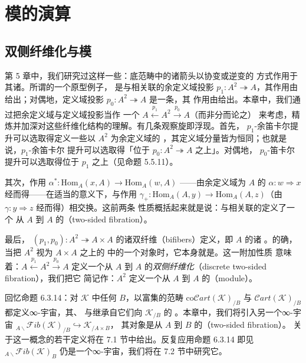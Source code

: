 \part{模的演算}
\chapter{双侧纤维化与模}\label{ch:two-sided-fibrations-modules}


第 5 章中，我们研究过这样一些\trIsofibration：底范畴中的诸箭头以协变或逆变的
方式作用于其诸\trFiber。所谓\emph{\trCocartesianFibration}的一个原型例子，
是与\trArrowInfinityCategory{}相关联的余定义域投影\trFunctor{}
$p_{1}\colon A^{2}\twoheadrightarrow A$，其\trFiberwise{}作用由%
\trPostComposition{}给出；对偶地，定义域投影\trFunctor{}
$p_{0}\colon A^{2}\twoheadrightarrow A$ 是一条\trCartesianFibration，其%
\trFiberwise{}作用由\trPreComposition{}给出。本章中，我们通过把余定义域与定义域投影\trFunctor{}当作
一个\trSpan{} $A\xleftarrow{p_{1}}A^{2}\xrightarrow{p_{0}}A$（而非分而论之）
来考虑，精炼并加深对这些纤维化结构的理解。有几条观察旋即浮现。首先，%
$p_{1}$-余笛卡尔提升可以选取得定义一些以 $A^{2}$ 为余定义域的%
\trNaturalTransformation，其定义域分量皆为恒同；也就是说，$p_{1}$-余笛卡尔
提升可以选取得「位于 $p_{0}\colon A^{2}\twoheadrightarrow A$ 之上」。对偶地，
$p_{0}$-笛卡尔提升可以选取得位于 $p_{1}$ 之上（见命题 5.5.11）。

其次，\trFiberwise{}作用 $\alpha^{*}\colon\mathrm{Hom}_{A}(x,A)\to\mathrm{Hom}_{A}(w,A)$
——由余定义域为 $A$ 的\trNaturalTransformation{} $\alpha\colon w\Rightarrow x$
经\trPreComposition{}而得——在适当的意义下，与作用
$\gamma_{+}\colon\mathrm{Hom}_{A}(A,y)\to\mathrm{Hom}_{A}(A,z)$（由
$\gamma\colon y\Rightarrow z$ 经\trPostComposition{}而得）相交换。这前两条
性质概括起来就是说：与\trArrowInfinityCategory{}相关联的\trSpan{}定义了一个
从 $A$ 到 $A$ 的\emph{\trTwoSidedFibration}（two-sided fibration）。

最后，\trIsofibration{} $(p_{1},p_{0})\colon A^{2}\twoheadrightarrow A\times A$
的诸双纤维（bifibers）定义\trDiscrete{}\trInfinityCategory，即 $A$ 的诸%
\trMappingSpace。的确，当把 $A^{2}$ 视为 $A\times A$ 之上的%
\trSliceInfinityCosmos{}中的一个对象时，它本身就是\trDiscrete。这一附加性质
意味着：$A\xleftarrow{p_{1}}A^{2}\xrightarrow{p_{0}}A$ 定义一个从 $A$ 到 $A$
的\emph{\trDiscrete{}双侧纤维化}（discrete two-sided fibration），我们把它
简记作：$A^{2}$ 定义一个从 $A$ 到 $A$ 的\emph{\trModule}（module）。

回忆命题 6.3.14：对\trInfinityCosmos{} $\mathcal{K}$ 中任何\trInfinityCategory{}
$B$，以\trQuasiCategory{}富集的范畴 $\mathrm{co}\mathcal{C}\mathit{art}(\mathcal{K})_{/B}$
与 $\mathcal{C}\mathit{art}(\mathcal{K})_{/B}$ 都定义∞-宇宙，其\trLimit、%
\trIsofibration{}与\trEquivalence{}继承自它们向 $\mathcal{K}_{/B}$ 的%
\trCosmologicalEmbedding。本章中，我们将引入另一个\trCosmologicallyEmbedded{}∞-宇宙
${}_{A\backslash}\mathcal{F}\mathit{ib}(\mathcal{K})_{/B}\hookrightarrow\mathcal{K}_{/A\times B}$，
其对象是从 $A$ 到 $B$ 的\emph{\trTwoSidedFibration}（two-sided fibration）。
关于这一概念的若干\trEquivalence{}定义将在 7.1 节中给出。反复应用命题 6.3.14
即见 ${}_{A\backslash}\mathcal{F}\mathit{ib}(\mathcal{K})_{B}$ 仍是一个∞-宇宙，我们将在
7.2 节中研究它。

